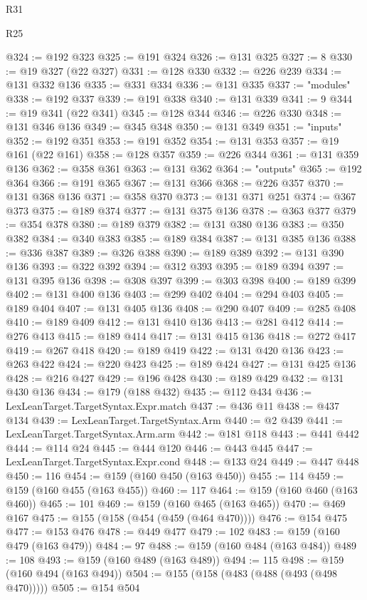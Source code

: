 \begin{lexlean}{R31}
\begin{lexlean}{R25}
\begin{coremodule}
{{{{{{{{{{{{{{{{{{{{{{{{{{{{{{{{{{{{{{{{{{{{{{{{{{{{{{{{{{{{{{{{{{{{{{{{{{{{{{{{{{{{{{{{{{{{{{{{{{{{{{{{{{{{{{{{{{{{{{{{{{{{{{{{{{{{{{{{{{{{{{{{{{{{{{{{{{{{{{{{{{{{{{{{{{{{{{{{{{{{{{{{{{{{{{{{{{{{{{{@324 := @192 @323
@325 := @191 @324
@326 := @131 @325
@327 := 8
@330 := @19 @327 (@22 @327)
@331 := @128 @330
@332 := @226 @239
@334 := @131 @332 @136
@335 := @331 @334
@336 := @131 @335
@337 := "modules"
@338 := @192 @337
@339 := @191 @338
@340 := @131 @339
@341 := 9
@344 := @19 @341 (@22 @341)
@345 := @128 @344
@346 := @226 @330
@348 := @131 @346 @136
@349 := @345 @348
@350 := @131 @349
@351 := "inputs"
@352 := @192 @351
@353 := @191 @352
@354 := @131 @353
@357 := @19 @161 (@22 @161)
@358 := @128 @357
@359 := @226 @344
@361 := @131 @359 @136
@362 := @358 @361
@363 := @131 @362
@364 := "outputs"
@365 := @192 @364
@366 := @191 @365
@367 := @131 @366
@368 := @226 @357
@370 := @131 @368 @136
@371 := @358 @370
@373 := @131 @371 @251
@374 := @367 @373
@375 := @189 @374
@377 := @131 @375 @136
@378 := @363 @377
@379 := @354 @378
@380 := @189 @379
@382 := @131 @380 @136
@383 := @350 @382
@384 := @340 @383
@385 := @189 @384
@387 := @131 @385 @136
@388 := @336 @387
@389 := @326 @388
@390 := @189 @389
@392 := @131 @390 @136
@393 := @322 @392
@394 := @312 @393
@395 := @189 @394
@397 := @131 @395 @136
@398 := @308 @397
@399 := @303 @398
@400 := @189 @399
@402 := @131 @400 @136
@403 := @299 @402
@404 := @294 @403
@405 := @189 @404
@407 := @131 @405 @136
@408 := @290 @407
@409 := @285 @408
@410 := @189 @409
@412 := @131 @410 @136
@413 := @281 @412
@414 := @276 @413
@415 := @189 @414
@417 := @131 @415 @136
@418 := @272 @417
@419 := @267 @418
@420 := @189 @419
@422 := @131 @420 @136
@423 := @263 @422
@424 := @220 @423
@425 := @189 @424
@427 := @131 @425 @136
@428 := @216 @427
@429 := @196 @428
@430 := @189 @429
@432 := @131 @430 @136
@434 := @179 (@188 @432)
@435 := @112 @434
@436 := LexLeanTarget.TargetSyntax.Expr.match
@437 := @436 @11
@438 := @437 @134
@439 := LexLeanTarget.TargetSyntax.Arm
@440 := @2 @439
@441 := LexLeanTarget.TargetSyntax.Arm.arm
@442 := @181 @118
@443 := @441 @442
@444 := @114 @24
@445 := @444 @120
@446 := @443 @445
@447 := LexLeanTarget.TargetSyntax.Expr.cond
@448 := @133 @24
@449 := @447 @448
@450 := 116
@454 := @159 (@160 @450 (@163 @450))
@455 := 114
@459 := @159 (@160 @455 (@163 @455))
@460 := 117
@464 := @159 (@160 @460 (@163 @460))
@465 := 101
@469 := @159 (@160 @465 (@163 @465))
@470 := @469 @167
@475 := @155 (@158 (@454 (@459 (@464 @470))))
@476 := @154 @475
@477 := @153 @476
@478 := @449 @477
@479 := 102
@483 := @159 (@160 @479 (@163 @479))
@484 := 97
@488 := @159 (@160 @484 (@163 @484))
@489 := 108
@493 := @159 (@160 @489 (@163 @489))
@494 := 115
@498 := @159 (@160 @494 (@163 @494))
@504 := @155 (@158 (@483 (@488 (@493 (@498 @470)))))
@505 := @154 @504
}}}}}}}}}}}}}}}}}}}}}}}}}}}}}}}}}}}}}}}}}}}}}}}}}}}}}}}}}}}}}}}}}}}}}}}}}}}}}}}}}}}}}}}}}}}}}}}}}}}}}}}}}}}}}}}}}}}}}}}}}}}}}}}}}}}}}}}}}}}}}}}}}}}}}}}}}}}}}}}}}}}}}}}}}}}}}}}}}}}}}}}}}}}}}}}}}}}}}}}
\end{coremodule}
\end{lexlean}
\end{lexlean}
